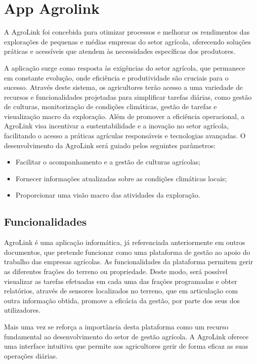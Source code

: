 \documentclass[a4paper,12pt]{report}
\begin{document}
	\newpage
	\tableofcontents	
	
	\chapter{App Agrolink}
	A AgroLink foi concebida para otimizar processos e melhorar os rendimentos das explorações de pequenas e médias empresas do setor agrícola, oferecendo soluções práticas e acessíveis que atendem às necessidades específicas dos produtores.
	
	A aplicação surge como resposta às exigências do setor agrícola, que permanece em constante evolução, onde eficiência e produtividade são cruciais para o sucesso. Através deste sistema, os agricultores terão acesso a uma variedade de recursos e funcionalidades projetadas para simplificar tarefas diárias, como gestão de culturas, monitorização de condições climáticas, gestão de tarefas e visualização macro da exploração. Além de promover a eficiência operacional, a AgroLink visa incentivar a
	sustentabilidade e a inovação no setor agrícola, facilitando o acesso a práticas agrículas responsáveis e tecnologias avançadas. O desenvolvimento da AgroLink será guiado pelos seguintes parâmetros:
	
	\begin{itemize}
		\item Facilitar o acompanhamento e a gestão de culturas agrícolas;
		\item Fornecer informações atualizadas sobre as condições climáticas locais;
	     \item Proporcionar uma visão macro das atividades da exploração.
	\end{itemize}
		
	\section{Funcionalidades}
	AgroLink é uma aplicação informática, já referenciada anteriormente em outros documentos, que pretende funcionar como uma plataforma de gestão ao apoio do trabalho das empresas agrícolas. As funcionalidades da plataforma permitem gerir as diferentes frações do terreno ou propriedade. Deste modo, será possível visualizar as tarefas efetuadas em cada uma das frações programadas e obter relatórios, através de sensores localizados no terreno, que em articulação com outra informação obtida, promove a eficácia da gestão, por parte dos seus dos utilizadores.
	
	Mais uma vez se reforça a importância desta plataforma como um recurso fundamental ao desenvolvimento do setor de gestão agrícola. A AgroLink oferece uma interface intuitiva que	permite aos agricultores gerir de forma eficaz as suas operações diárias. 
	
\end{document}
